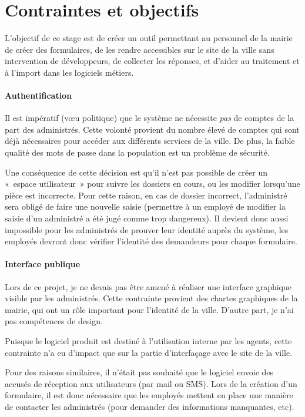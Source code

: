 \section{Contraintes et objectifs}\label{sec:contraintes-et-objectifs}

L'objectif de ce stage est de créer un outil permettant au personnel de la mairie de créer des formulaires, de les rendre accessibles sur le site de la ville sans intervention de développeurs, de collecter les réponses, et d'aider au traitement et à l'import dans les logiciels métiers.

\paragraph{Authentification}
Il est impératif (vœu politique) que le système ne nécessite \emph{pas} de comptes de la part des administrés.
Cette volonté provient du nombre élevé de comptes qui sont déjà nécessaires pour accéder aux différents services de la ville.
De plus, la faible qualité des mots de passe dans la population est un problème de sécurité.

Une conséquence de cette décision est qu'il n'est pas possible de créer un «~espace utilisateur~» pour suivre les dossiers en cours, ou les modifier lorsqu'une pièce est incorrecte.
Pour cette raison, en cas de dossier incorrect, l'administré sera obligé de faire une nouvelle saisie (permettre à un employé de modifier la saisie d'un administré a été jugé comme trop dangereux).
Il devient donc aussi impossible pour les administrés de prouver leur identité auprès du système, les employés devront donc vérifier l'identité des demandeurs pour chaque formulaire.

\paragraph{Interface publique}
Lors de ce projet, je ne devais pas être amené à réaliser une interface graphique visible par les administrés.
Cette contrainte provient des chartes graphiques de la mairie, qui ont un rôle important pour l'identité de la ville.
D'autre part, je n'ai pas compétences de design.

Puisque le logiciel produit est destiné à l'utilisation interne par les agents, cette contrainte n'a eu d'impact que sur la partie d'interfaçage avec le site de la ville.

Pour des raisons similaires, il n'était pas souhaité que le logiciel envoie des accusés de réception aux utilisateurs (par mail ou SMS).
Lors de la création d'un formulaire, il est donc nécessaire que les employés mettent en place une manière de contacter les administrés (pour demander des informations manquantes, etc).

